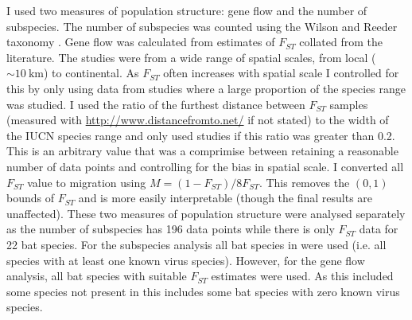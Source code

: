 I used two measures of population structure: gene flow and the number of subspecies.
The number of subspecies was counted using the Wilson and Reeder taxonomy \cite{wilson2005mammal}.
Gene flow was calculated from estimates of $F_{ST}$ collated from the literature.
The studies were from a wide range of spatial scales, from local ($\sim\SI{10}{\kilo\metre}$) to continental.
As $F_{ST}$ often increases with spatial scale \cite{burland1999population, hulva2010mechanisms, o2015genetic, vonhof2015range} I controlled for this by only using data from studies where a large proportion of the species range was studied.
I used the ratio of the furthest distance between $F_{ST}$ samples (measured with \url{http://www.distancefromto.net/} if not stated) to the width of the IUCN species range \cite{iucn} and only used studies if this ratio was greater than 0.2.
This is an arbitrary value that was a comprimise between retaining a reasonable number of data points and controlling for the bias in spatial scale.
I converted all $F_{ST}$ value to migration using $M = (1-F_{ST})/8F_{ST}$.
This removes the $(0, 1)$ bounds of $F_{ST}$ and is more easily interpretable (though the final results are unaffected). 
These two measures of population structure were analysed separately as the number of subspecies has 196 data points while there is only $F_{ST}$ data for 22 bat species.
For the subspecies analysis all bat species in \textcite{luis2013comparison} were used (i.e. all species with at least one known virus species).
However, for the gene flow analysis, all bat species with suitable $F_{ST}$ estimates were used.
As this included some species not present in \textcite{luis2013comparison} this includes some bat species with zero known virus species. 




























